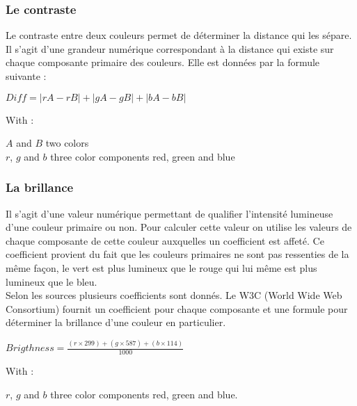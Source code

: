 \documentclass[french,a4paper]{report}
\begin{document}
{\subsubsection{Le contraste}
Le contraste entre deux couleurs permet de déterminer la distance qui
les sépare. Il s'agit d'une grandeur numérique correspondant à la
distance qui existe sur chaque
composante primaire des couleurs. Elle est données par la formule suivante : \\
\label{formulecontraste}
\begin{center}
$\displaystyle Diff = |rA - rB| + |gA - gB| + |bA - bB|$\\
\vspace{0.4cm}
\small
\begin{minipage}{0.8\textwidth}
With :
\begin{center}\begin{minipage}{0.9\textwidth}
$A$ and $B$ two colors\\
$r$, $g$ and $b$ three color components red, green and blue
\end{minipage}\end{center}
\end{minipage}
\end{center}
\subsubsection{La brillance}
Il s'agit d'une valeur numérique permettant de qualifier l'intensité
lumineuse d'une couleur primaire ou non. Pour calculer cette valeur on
utilise les valeurs de chaque composante de cette couleur auxquelles
un coefficient est affeté. Ce coefficient provient du fait que les
couleurs primaires ne sont pas ressenties de la même façon, le vert est
plus
lumineux que le rouge qui lui même est plus lumineux que le bleu.\\
Selon les sources plusieurs coefficients sont donnés. Le W3C (World
Wide Web Consortium) fournit un coefficient pour chaque composante et
une formule pour déterminer la brillance
d'une couleur en particulier.\\
\begin{center}
$\displaystyle Brigthness = \frac{(r \times 299) + (g \times 587) + (b \times 114)}{1000}$\\
\vspace{0.4cm}
\small
\begin{minipage}{0.8\textwidth}
With :
\begin{center}\begin{minipage}{0.9\textwidth}
$r$, $g$ and $b$ three color components red, green and blue.
\end{minipage}\end{center}
\end{minipage}
\end{center}
}
\end{document}
